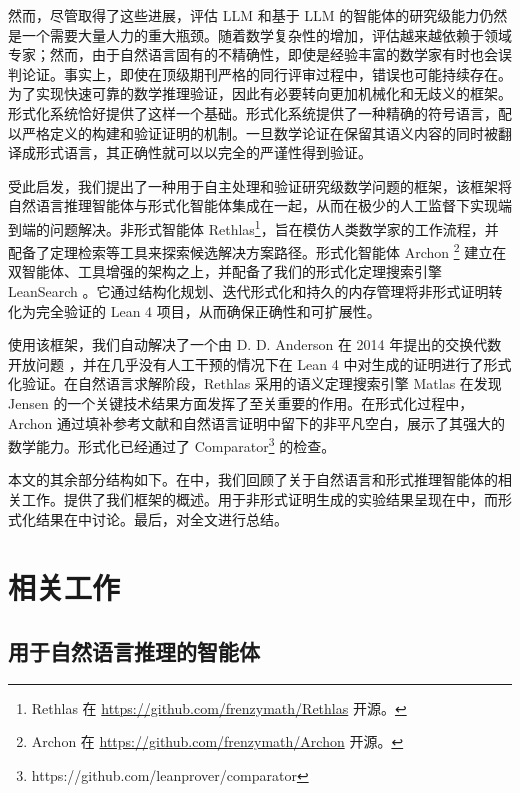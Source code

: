 \documentclass[]{pkuai4m}
\theoremstyle{plain}
\theoremstyle{definition}
\begin{document}
然而，尽管取得了这些进展，评估 LLM 和基于 LLM 的智能体的研究级能力仍然是一个需要大量人力的重大瓶颈。随着数学复杂性的增加，评估越来越依赖于领域专家；然而，由于自然语言固有的不精确性，即使是经验丰富的数学家有时也会误判论证。事实上，即使在顶级期刊严格的同行评审过程中，错误也可能持续存在。为了实现快速可靠的数学推理验证，因此有必要转向更加机械化和无歧义的框架。形式化系统恰好提供了这样一个基础。形式化系统提供了一种精确的符号语言，配以严格定义的构建和验证证明的机制。一旦数学论证在保留其语义内容的同时被翻译成形式语言，其正确性就可以以完全的严谨性得到验证。

受此启发，我们提出了一种用于自主处理和验证研究级数学问题的框架，该框架将自然语言推理智能体与形式化智能体集成在一起，从而在极少的人工监督下实现端到端的问题解决。非形式智能体 Rethlas\footnote{Rethlas 在 \href{https://github.com/frenzymath/Rethlas}{https://github.com/frenzymath/Rethlas} 开源。}，旨在模仿人类数学家的工作流程，并配备了定理检索等工具来探索候选解决方案路径。形式化智能体 Archon \footnote{Archon 在 \href{https://github.com/frenzymath/Archon}{https://github.com/frenzymath/Archon} 开源。} 建立在双智能体、工具增强的架构之上，并配备了我们的形式化定理搜索引擎 LeanSearch \cite{gao2024semantic}。它通过结构化规划、迭代形式化和持久的内存管理将非形式证明转化为完全验证的 Lean 4 项目，从而确保正确性和可扩展性。

使用该框架，我们自动解决了一个由 D. D. Anderson 在 2014 年提出的交换代数开放问题 \cite{cahen2014open}，并在几乎没有人工干预的情况下在 Lean 4 中对生成的证明进行了形式化验证。在自然语言求解阶段，Rethlas 采用的语义定理搜索引擎 Matlas 在发现 Jensen \cite{jensen2006completions} 的一个关键技术结果方面发挥了至关重要的作用。在形式化过程中，Archon 通过填补参考文献和自然语言证明中留下的非平凡空白，展示了其强大的数学能力。形式化已经通过了 Comparator\footnote{https://github.com/leanprover/comparator} 的检查。

本文的其余部分结构如下。在中，我们回顾了关于自然语言和形式推理智能体的相关工作。提供了我们框架的概述。用于非形式证明生成的实验结果呈现在中，而形式化结果在中讨论。最后，对全文进行总结。

\section{相关工作}\label{sec:related}
\subsection{用于自然语言推理的智能体}
\end{document}
